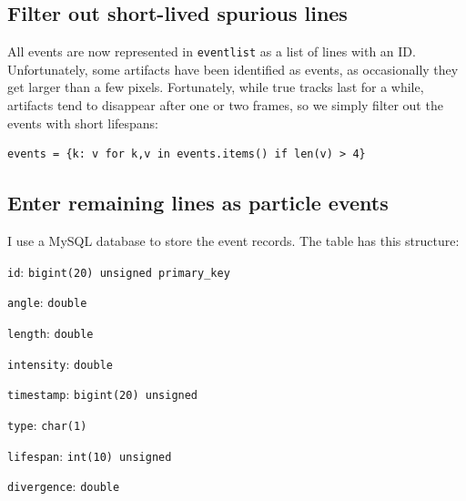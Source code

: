 \documentclass[notitlepage,12pt]{article}
\begin{document}
\subsection{Filter out short-lived spurious lines}

All events are now represented in \texttt{eventlist} as a list of lines with an ID.  Unfortunately, some artifacts have been identified as events, as occasionally they get larger than a few pixels.  Fortunately, while true tracks last for a while, artifacts tend to disappear after one or two frames, so we simply filter out the events with short lifespans:
\begin{lstlisting}
events = {k: v for k,v in events.items() if len(v) > 4}
\end{lstlisting}

\subsection{Enter remaining lines as particle events}

I use a MySQL database to store the event records.  The table has this structure:

\begin{description}
	\item \texttt{id}: \texttt{bigint(20) unsigned primary\_key} 
	\item\texttt{angle}: \texttt{double}
	\item\texttt{length}: \texttt{double} 
	\item\texttt{intensity}: \texttt{double}
	\item\texttt{timestamp}: \texttt{bigint(20) unsigned}
	\item\texttt{type}: \texttt{char(1)} 
	\item\texttt{lifespan}: \texttt{int(10) unsigned}
	\item\texttt{divergence}: \texttt{double}
\end{description}
\end{document}
